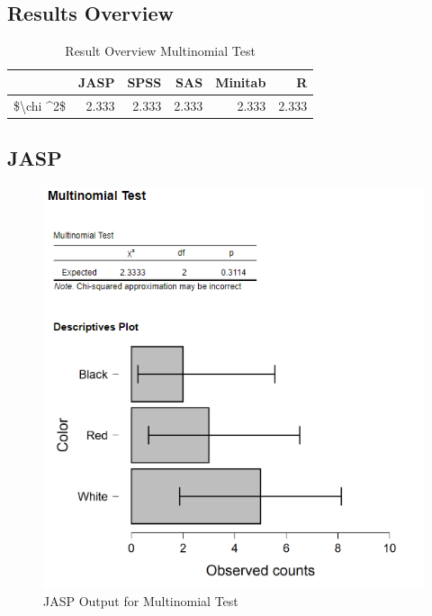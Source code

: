 \documentclass[
]{book}
\begin{document}
\hypertarget{results-overview-1}{%
\subsection{Results Overview}\label{results-overview-1}}

\begin{table}

\caption{\label{tab:unnamed-chunk-106}Result Overview Multinomial Test}
\centering
\begin{tabular}[t]{lrrrrr}
\toprule
  & JASP & SPSS & SAS & Minitab & R\\
\midrule
\$\textbackslash{}chi \textasciicircum{}2\$ & 2.333 & 2.333 & 2.333 & 2.333 & 2.333\\
\bottomrule
\end{tabular}
\end{table}

\hypertarget{jasp-1}{%
\subsection{JASP}\label{jasp-1}}

\begin{figure}[!h]
\includegraphics{Screenshots/Multinomial Test/mntJASP} \caption{\label{fig:mntJASP}JASP Output for Multinomial Test}\label{fig:mntJASP}
\end{figure}
\end{document}
